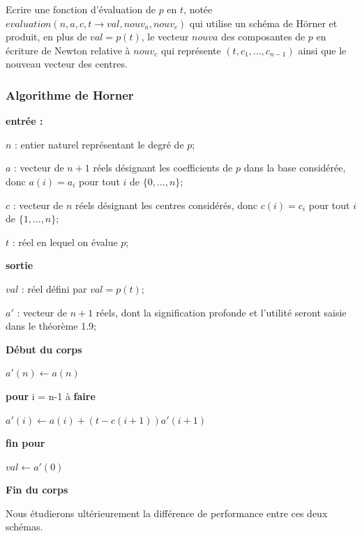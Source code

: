 \documentclass[a4paper,10pt]{report}
\begin{document}
Ecrire une fonction d’évaluation de $p$ en $t$, notée $evaluation(n, a, c, t →
val, nouv_a, nouv_c)$ qui utilise un schéma de Hörner et produit, en plus de
$val = p(t)$, le vecteur $nouv{a}$ des composantes de $p$ en écriture de Newton
relative à $nouv_c$ qui représente $(t, c_{1}, ..., c_{n−1})$ ainsi que le nouveau vecteur des centres.

\subsubsection*{Algorithme de Horner}

\textbf{entrée :}

\begin{list}{}{}
\item $n$ : entier naturel représentant le degré de $p$;
\item $a$ : vecteur de $n+1$ réels désignant les coefficients de $p$ dans la base considérée, donc $a(i) = a_{i}$ pour tout $i$ de $\lbrace 0, ..., n\rbrace$;
\item $c$ : vecteur de $n$ réels désignant les centres considérés, donc $c(i)=c_{i}$ pour tout $i$ de $\lbrace 1, ..., n\rbrace$;
\item $t$ : réel en lequel on évalue $p$;
\end{list}

\textbf{sortie}
\begin{list}{}{}
\item $val$ : réel défini par $val = p(t)$;
\item $a'$ : vecteur de $n+1$ réels, dont la signification profonde et l'utilité seront saisie dans le théorème 1.9;
\end{list}

\textbf{Début du corps}
\begin{list}{}{}
\item $a'(n) \longleftarrow a(n)$
\item \textbf{pour} i = n-1 à \textbf{faire}
\item \begin{list}{}{}
\item $a'(i) \longleftarrow a(i) + (t-c(i+1))a'(i+1)$
\end{list}
\item \textbf{fin pour}
\item $val \longleftarrow a'(0)$
\end{list}

\textbf{Fin du corps}

Nous étudierons ultérieurement la différence de performance entre ces deux schémas. 
\end{document}
